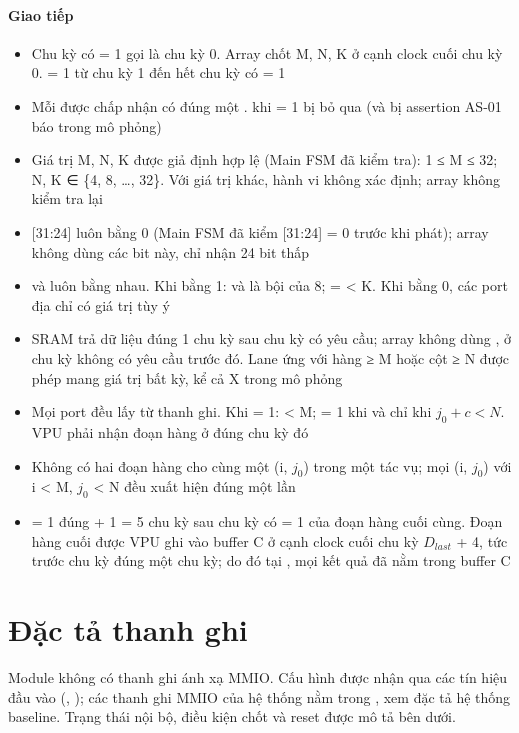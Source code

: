 \documentclass[10pt,a4paper]{article}
\begin{document}
\paragraph{Giao tiếp}\label{par:3-2}
\begin{itemize}
\item Chu kỳ có  = 1 gọi là chu kỳ 0. Array chốt M, N, K ở cạnh clock cuối chu kỳ 0.  = 1 từ chu kỳ 1 đến hết chu kỳ có  = 1
\item Mỗi  được chấp nhận có đúng một .  khi  = 1 bị bỏ qua (và bị assertion AS-01 báo trong mô phỏng)
\item Giá trị M, N, K được giả định hợp lệ (Main FSM đã kiểm tra): 1 ≤ M ≤ 32; N, K ∈ \{4, 8, …, 32\}. Với giá trị khác, hành vi không xác định; array không kiểm tra lại
\item {}[31:24] luôn bằng 0 (Main FSM đã kiểm [31:24] = 0 trước khi phát); array không dùng các bit này,  chỉ nhận 24 bit thấp
\item {} và  luôn bằng nhau. Khi bằng 1:  và  là bội của 8;  =  < K. Khi bằng 0, các port địa chỉ có giá trị tùy ý
\item SRAM trả dữ liệu đúng 1 chu kỳ sau chu kỳ có yêu cầu; array không dùng ,  ở chu kỳ không có yêu cầu trước đó. Lane ứng với hàng ≥ M hoặc cột ≥ N được phép mang giá trị bất kỳ, kể cả X trong mô phỏng
\item Mọi port  đều lấy từ thanh ghi. Khi  = 1:  < M;  = 1 khi và chỉ khi $j_0 + c < N$. VPU phải nhận đoạn hàng ở đúng chu kỳ đó
\item Không có hai đoạn hàng cho cùng một (i, $j_0$) trong một tác vụ; mọi (i, $j_0$) với i < M, $j_0$ < N đều xuất hiện đúng một lần
\item {} = 1 đúng  + 1 = 5 chu kỳ sau chu kỳ có  = 1 của đoạn hàng cuối cùng. Đoạn hàng cuối được VPU ghi vào buffer C ở cạnh clock cuối chu kỳ $D_{last}$ + 4, tức trước chu kỳ  đúng một chu kỳ; do đó tại , mọi kết quả đã nằm trong buffer C
\end{itemize}

\section{Đặc tả thanh ghi}
Module không có thanh ghi ánh xạ MMIO. Cấu hình được nhận qua các tín hiệu đầu vào (, ); các thanh ghi MMIO của hệ thống nằm trong , xem đặc tả hệ thống baseline. Trạng thái nội bộ, điều kiện chốt và reset được mô tả bên dưới.
\end{document}
